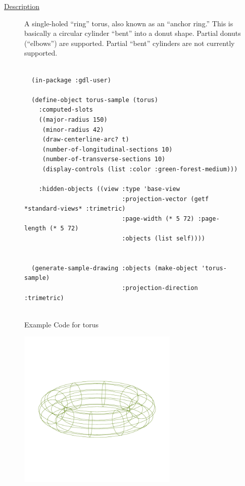 \documentclass [11pt]{book}
\begin{document}
\begin{itemize}
\begin{description}
\item [
\underline{Description}]


A single-holed ``ring'' torus, also known as an ``anchor ring.''
This is basically a circular cylinder ``bent'' into a donut shape. Partial donuts (``elbows'') are supported.
Partial ``bent'' cylinders are not currently supported.



\end{description}




\begin{figure}
\begin{lrbox}{\boxedverb}
\begin{minipage}{\linewidth}
{\small

\begin{verbatim}
  
  (in-package :gdl-user)
  
  (define-object torus-sample (torus)
    :computed-slots
    ((major-radius 150)
     (minor-radius 42)
     (draw-centerline-arc? t)
     (number-of-longitudinal-sections 10)
     (number-of-transverse-sections 10)
     (display-controls (list :color :green-forest-medium)))

    :hidden-objects ((view :type 'base-view
                           :projection-vector (getf *standard-views* :trimetric)
                           :page-width (* 5 72) :page-length (* 5 72)
                           :objects (list self))))
  

  (generate-sample-drawing :objects (make-object 'torus-sample) 
                           :projection-direction :trimetric)
                  

\end{verbatim}}
\end{minipage}
\end{lrbox}
\fbox{\usebox{\boxedverb}}

\caption{Example Code for torus}

\label{fig:example-code-torus}

\end{figure}

\begin{figure}
\begin{center}
\includegraphics[width=3in,height=3in]{../images/example-torus.pdf}
\end{center}


\end{figure}
\end{itemize}
\end{document}
